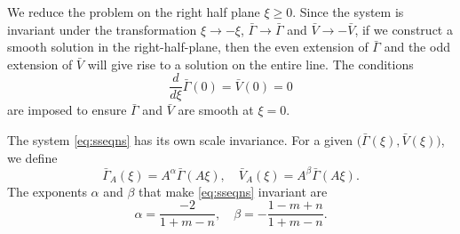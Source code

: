 \documentclass[a4paper,11pt]{article}
\def\bG{\bar{\Gamma}}
\def\bV{\bar{V}}
\numberwithin{step}{dummy}
\begin{document}
We reduce the problem on the right half plane $\xi \ge 0$.  Since the system is invariant under the transformation $\xi \rightarrow -\xi$, $\bG \rightarrow \bG$ and $\bV \rightarrow -\bV$, if we construct a smooth solution in the right-half-plane, then the even extension of $\bG$ and the odd extension of $\bV$ will give rise to a solution on the entire line. The conditions
\begin{equation} \label{eq:continuity}
 \frac{d}{d\xi}\bG(0)=\bV(0)=0
\end{equation}
are imposed to ensure $\bG$ and $\bV$ are smooth at $\xi=0$.

The system \eqref{eq:sseqns} has its own scale invariance. For a given $\big(\bG(\xi), \bV(\xi)\big)$, we define
\begin{equation}
 \bG_A(\xi) = A^\alpha \bG(A\xi), \quad \bV_A(\xi) = A^\beta \bG(A\xi).
\end{equation}
The exponents $\alpha$ and $\beta$ that make \eqref{eq:sseqns} invariant are
\begin{equation}
\alpha = \frac{-2}{1+m-n}, \quad \beta = - \frac{1-m+n}{1+m-n}. \label{eq:alpha_beta}
\end{equation}
\end{document}
